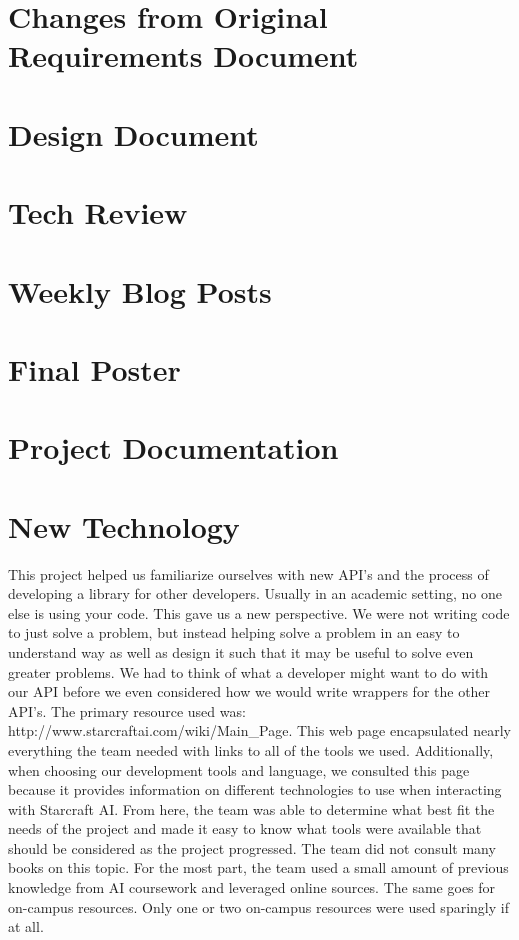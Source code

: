 \documentclass[10pt,letterpaper,onecolumn,draftclsnofoot]{IEEEtran}
\begin{document}
\section{Changes from Original Requirements Document}

\section{Design Document}

\section{Tech Review}

\section{Weekly Blog Posts}

\section{Final Poster}

\newpage

\section{Project Documentation}

\section{New Technology}
	This project helped us familiarize ourselves with new API's and the process of developing a library for other developers. Usually in an academic setting, no one else is using your code. This gave us a new perspective. We were not writing code to just solve a problem, but instead helping solve a problem in an easy to understand way as well as design it such that it may be useful to solve even greater problems. We had to think of what a developer might want to do with our API before we even considered how we would write wrappers for the other API's. 
	The primary resource used was: http://www.starcraftai.com/wiki/Main\_Page. This web page encapsulated nearly everything the team needed with links to all of the tools we used. Additionally, when choosing our development tools and language, we consulted this page because it provides information on different technologies to use when interacting with Starcraft AI. From here, the team was able to determine what best fit the needs of the project and made it easy to know what tools were available that should be considered as the project progressed.
	The team did not consult many books on this topic. For the most part, the team used a small amount of previous knowledge from AI coursework and leveraged online sources. The same goes for on-campus resources. Only one or two on-campus resources were used sparingly if at all. 
\end{document}
